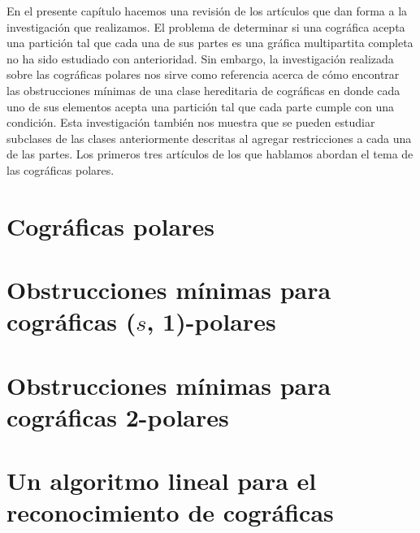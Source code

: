 En el presente capítulo hacemos una revisión de los artículos que dan forma a la investigación que realizamos. El problema de determinar si una cográfica acepta una partición tal que cada una de sus partes es una gráfica multipartita completa no ha sido estudiado con anterioridad. Sin embargo, la investigación realizada sobre las cográficas polares nos sirve como referencia acerca de cómo encontrar las obstrucciones mínimas de una clase hereditaria de cográficas en donde cada uno de sus elementos acepta una partición tal que cada parte cumple con una condición. Esta investigación también nos muestra que se pueden estudiar subclases de las clases anteriormente descritas al agregar restricciones a cada una de las partes. Los primeros tres artículos de los que hablamos abordan el tema de las cográficas polares. %

\section{Cográficas polares}
    

\section{Obstrucciones mínimas para cográficas ($s$, 1)-polares}
    

\section{Obstrucciones mínimas para cográficas 2-polares}
    


\section{Un algoritmo lineal para el reconocimiento de cográficas}

